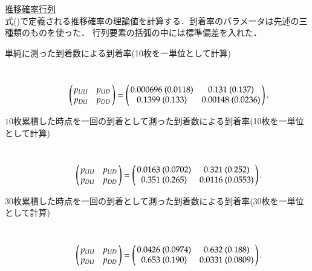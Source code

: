 \documentclass[a4j,papersize,disablejfam,slide,14pt]{jsarticle}
\begin{document}
\underline{\large 推移確率行列}\\
	式()で定義される推移確率の理論値を計算する．到着率のパラメータは先述の三種類のものを使った．
    行列要素の括弧の中には標準偏差を入れた．
    \begin{description}
    	\item[単純に測った到着数による到着率(10枚を一単位として計算)]\mbox{}\\
        	\begin{align}
    			\left(
    			\begin{array}{@{\,}cc@{\,}}
    				p_{UU} & p_{UD} \\
            		p_{DU} & p_{DD}
    			\end{array}
    			\right)
                = \left(
    			\begin{array}{@{\,}cc@{\,}}
    				{0.000696\ (0.0118)} & {0.131\ (0.137)} \\
            		{0.1399\ (0.133)} & {0.00148\ (0.0236)}
    			\end{array}
    			\right).
    		\end{align}
        
        \item[$10$枚累積した時点を一回の到着として測った到着数による到着率(10枚を一単位として計算)]\mbox{}\\
        	\begin{align}
    			\left(
    			\begin{array}{@{\,}cc@{\,}}
    				p_{UU} & p_{UD} \\
            		p_{DU} & p_{DD}
    			\end{array}
    			\right)
                = \left(
    			\begin{array}{@{\,}cc@{\,}}
    				{0.0163\ (0.0702)} & {0.321\ (0.252)} \\
            		{0.351\ (0.265)} & {0.0116\ (0.0553)}
    			\end{array}
    			\right).
    		\end{align}
        
        \item[$30$枚累積した時点を一回の到着として測った到着数による到着率(30枚を一単位として計算)]\mbox{}\\
        	\begin{align}
    			\left(
    			\begin{array}{@{\,}cc@{\,}}
    				p_{UU} & p_{UD} \\
            		p_{DU} & p_{DD}
    			\end{array}
    			\right)
                = \left(
    			\begin{array}{@{\,}cc@{\,}}
    				{0.0426\ (0.0974)} & {0.632\ (0.188)} \\
            		{0.653\ (0.190)} & {0.0331\ (0.0809)}
    			\end{array}
    			\right).
    		\end{align}
    \end{description}
    
\end{document}
